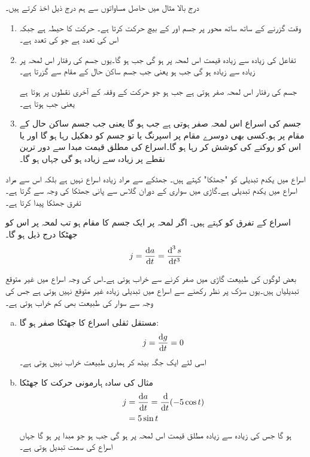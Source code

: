 درج بالا مثال میں حاصل مساواتوں سے ہم درج ذیل اخذ کرتے ہیں۔
\begin{enumerate}[1.]

\item
وقت گزرنے کے ساتھ ساتھ  محور پر جسم  اور  کے بیچ حرکت کرتا ہے۔ حرکت کا حیطہ  ہے جبکہ اس کی تعدد  ہے جو  کی تعدد ہے۔
\item
تفاعل  کی زیادہ سے زیادہ قیمت اس لمحہ پر ہو گی جب  ہو گا۔یوں جسم کی رفتار  اس لمحہ پر زیادہ سے زیادہ  ہو گی جب  ہو یعنی جب جسم ساکن حال کے مقام سے گزرتا ہے۔

جسم کی رفتار اس لمحہ صفر ہوتی ہے جب  ہو جو حرکت کے وقفہ کے آخری نقطوں پر ہوتا ہے یعنی جب  ہوتا ہے۔
\item
جسم کی اسراع  اس لمحہ صفر ہوتی ہے جب  ہو گا یعنی جب جسم ساکن حال کے مقام پر ہو۔کسی بھی دوسرے مقام پر اسپرنگ یا تو جسم کو دھکیل رہا ہو گا اور یا اس کو روکنے کی کوشش کر رہا ہو گا۔اسراع کی مطلق قیمت مبدا سے دور ترین نقطے پر زیادہ سے زیادہ ہو گی جہاں  ہو گا۔  
\end{enumerate}

اسراع میں یکدم تبدیلی کو "جھٹکا" کہتے ہیں۔ جھٹکے سے مراد زیادہ اسراع نہیں ہے بلکہ اس سے مراد اسراع میں یکدم تبدیلی ہے۔گاڑی میں سواری کے دوران گلاس سے پانی جھٹکا کی وجہ سے  گرتا ہے۔ تفرق  جھٹکا پیدا کرتا ہے۔

اسراع کے تفرق کو  کہتے ہیں۔ اگر لمحہ  پر ایک جسم کا مقام  ہو تب لمحہ  پر اس کو جھٹکا درج ذیل ہو گا۔
\begin{align*}
j=\frac{\dif a}{\dif t}=\frac{\dif ^{\,3}s}{\dif t^3}
\end{align*}

بعض لوگوں کی طبیعت  گاڑی میں صفر کرنے سے  خراب ہوتی ہے۔اس کی وجہ اسراع میں غیر متوقع تبدیلیاں ہیں۔یوں سڑک پر نظر رکھنے سے اسراع میں تبدیلی زیادہ غیر متوقع نہیں ہوتی ہے جس کی وجہ سے سوار کی طبیعت بھی کم خراب ہوتی ہے۔  

\begin{enumerate}[a.]

\item
مستقل ثقلی اسراع  کا جھٹکا صفر ہو گا:
\begin{align*}
j=\frac{\dif g}{\dif t}=0
\end{align*}
اسی لئے ایک جگہ بیٹھ کر ہماری طبیعت خراب نہیں ہوتی ہے۔
\item
مثال  کی سادہ ہارمونی حرکت  کا جھٹکا
\begin{align*}
j&=\frac{\dif a}{\dif t}=\frac{\dif}{\dif t}(-5\cos t)\\
&=5\sin t
\end{align*}
ہو گا جس کی زیادہ سے زیادہ مطلق قیمت اس لمحہ پر ہو گی جب  ہو جو مبدا پر ہو گا جہاں اسراع کی سمت تبدیل ہوتی ہے۔
\end{enumerate}

